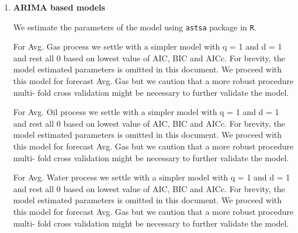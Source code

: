 \documentclass[a4paper]{article}
\begin{document}
\begin{enumerate}
\newpage
	\item  \textbf{ ARIMA based models }

We estimate the parameters of the model using \verb|astsa| package in \verb|R|. 

For Avg. Gas process we settle with a simpler model with q = 1 and d = 1 and rest all 0 based on lowest value of AIC, BIC and AICc. For brevity, the model estimated parameters is omitted in this document. We proceed with this model for forecast Avg. Gas but we caution that a more robust procedure multi- fold cross validation might be necessary to further validate the model. 

For Avg. Oil process we settle with a simpler model with q = 1 and d = 1 and rest all 0 based on lowest value of AIC, BIC and AICc. For brevity, the model estimated parameters is omitted in this document. We proceed with this model for forecast Avg. Gas but we caution that a more robust procedure multi- fold cross validation might be necessary to further validate the model. 

For Avg. Water process we settle with a simpler model with q = 1 and d = 1 and rest all 0 based on lowest value of AIC, BIC and AICc. For brevity, the model estimated parameters is omitted in this document. We proceed with this model for forecast Avg. Gas but we caution that a more robust procedure multi- fold cross validation might be necessary to further validate the model. 


\end{enumerate}

\newpage
\end{document}
